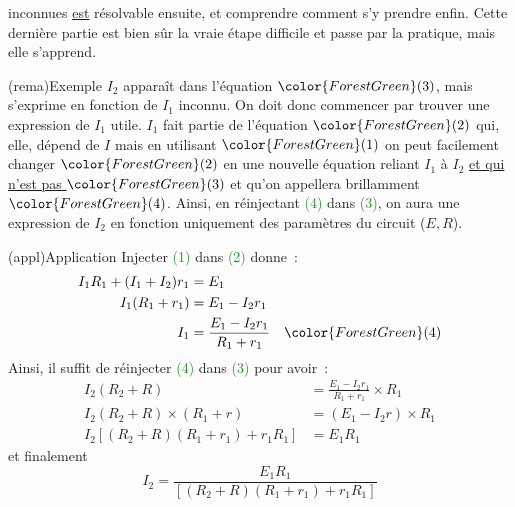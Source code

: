 \documentclass[../../main/main.tex]{subfiles}
\begin{document}
{\begin{tcbraster}[raster columns=2, raster equal height=rows]
\begin{tcb}
        inconnues \underline{est} résolvable ensuite, et comprendre comment s'y
        prendre enfin. Cette dernière partie est bien sûr la vraie étape
        difficile et passe par la pratique, mais elle s'apprend.
    \end{tcb}
    \begin{tcb}(rema){Exemple}
        $I_2$ apparaît dans l'équation $\color{ForestGreen}(3)$, mais s'exprime
        en fonction de $I_1$ inconnu. On doit donc commencer par trouver une
        expression de $I_1$ utile. $I_1$ fait partie de l'équation
        $\color{ForestGreen}(2)$ qui, elle, dépend de $I$ mais en utilisant
        $\color{ForestGreen}(1)$ on peut facilement changer
        $\color{ForestGreen}(2)$ en une nouvelle équation reliant $I_1$ à $I_2$
        \underline{et qui n'est pas $\color{ForestGreen}(3)$} et qu'on
        appellera brillamment $\color{ForestGreen}(4)$. Ainsi, en réinjectant
        \textcolor{ForestGreen}{(4)} dans \textcolor{ForestGreen}{(3)}, on aura
        une expression de $I_2$ en fonction uniquement des paramètres du circuit
        ($E, R$).
    \end{tcb}
\end{tcbraster}

\begin{center}
    \begin{tcb}[sidebyside, righthand ratio=.55](appl){Application}
        Injecter \textcolor{ForestGreen}{(1)} dans \textcolor{ForestGreen}{(2)}
        donne~:
        \begin{align*}
            I_1R_1 + (I_1+I_2)r_1 &= E_1\\
            I_1(R_1+r_1) &= E_1-I_2r_1\\
            I_1 &= \frac{E_1 - I_2r_1}{R_1 + r_1} \quad \color{ForestGreen}(4)
        \end{align*}
        Ainsi, il suffit de réinjecter \textcolor{ForestGreen}{(4)} dans
        \textcolor{ForestGreen}{(3)} pour avoir~:
        \tcblower
        \begin{align*}
            I_2(R_2+R) &= \frac{E_1 - I_2r_1}{R_1 + r_1}\times R_1\\
            I_2(R_2+R)\times(R_1+r) &= (E_1-I_2r)\times R_1\\
            I_2 \left[ (R_2+R)(R_1+r_1)+r_1R_1 \right] &= E_1R_1
        \end{align*}
        et finalement
        \[\boxed{I_2 = \frac{E_1R_1}{\left[ (R_2+R)(R_1+r_1)+r_1R_1 \right]}}\]
    \end{tcb}
\end{center}

}
\end{document}
